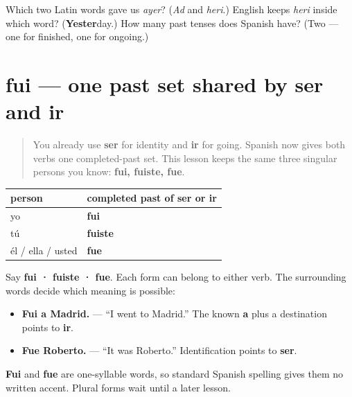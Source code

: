 \begin{tcolorbox}[breakable,colback=teal!4,colframe=teal!35!black,title={Before you move on}]
Which two Latin words gave us \emph{ayer}? (\emph{Ad} and \emph{heri}.) English keeps \emph{heri} inside which word? (\textbf{Yester}day.) How many past tenses does Spanish have? (Two — one for finished, one for ongoing.)
\end{tcolorbox}
\section[fui]{fui — one past set shared by ser and ir}

\label{lesson:ES-C14-ser-ir-preterite}



\begin{quote}
You already use \textbf{ser} for identity and \textbf{ir} for going. Spanish now gives both verbs one completed-past set. This lesson keeps the same three singular persons you know: \textbf{fui, fuiste, fue}.
\end{quote}

\begin{grammarlens}[title={Grammar Lens: three singular forms, two verbs}]
\noindent
\begin{tabularx}{\linewidth}{@{}>{\raggedright\arraybackslash}X>{\raggedright\arraybackslash}X@{}}
\toprule
\textbf{person} & \textbf{completed past of \textbf{ser} or \textbf{ir}} \\
\midrule
yo & \textbf{fui} \\
tú & \textbf{fuiste} \\
él / ella / usted & \textbf{fue} \\
\bottomrule
\end{tabularx}

Say \textbf{fui · fuiste · fue}. Each form can belong to either verb. The surrounding words decide which meaning is possible:

\begin{itemize}
\raggedright
  \item \textbf{Fui a Madrid.} — “I went to Madrid.” The known \textbf{a} plus a destination points to \textbf{ir}.
  \item \textbf{Fue Roberto.} — “It was Roberto.” Identification points to \textbf{ser}.
\end{itemize}

\textbf{Fui} and \textbf{fue} are one-syllable words, so standard Spanish spelling gives them no written accent. Plural forms wait until a later lesson.
\end{grammarlens}

